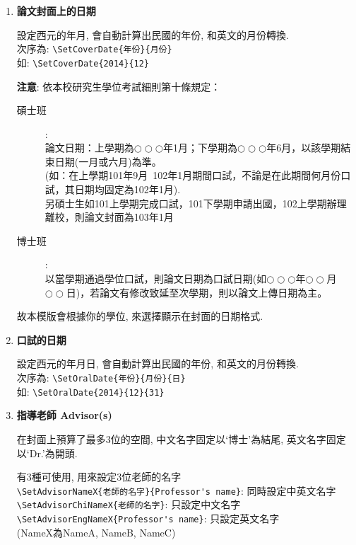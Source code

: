 \begin{enumerate}
  \item
  {
    \textbf{論文封面上的日期}

    設定西元的年月, 會自動計算出民國的年份, 和英文的月份轉換.\\
    次序為: \verb|\SetCoverDate{年份}{月份}|\\
    如: \verb|\SetCoverDate{2014}{12}|

    \textbf{注意}: 依本校研究生學位考試細則第十條規定：
      \begin{description}
        \item[碩士班]: \hfill\\
          論文日期：上學期為$\bigcirc\bigcirc\bigcirc$年1月；下學期為$\bigcirc\bigcirc\bigcirc$年6月，以該學期結束日期(一月或六月)為準。\\
          (如：在上學期101年9月~102年1月期間口試，不論是在此期間何月份口試，其日期均固定為102年1月).\\
          另碩士生如101上學期完成口試，101下學期申請出國，102上學期辦理離校，則論文封面為103年1月

        \item[博士班]: \hfill\\
        以當學期通過學位口試，則論文日期為口試日期(如$\bigcirc\bigcirc\bigcirc$年$\bigcirc\bigcirc$月$\bigcirc\bigcirc$日)，若論文有修改致延至次學期，則以論文上傳日期為主。
      \end{description}
    故本模版會根據你的學位, 來選擇顯示在封面的日期格式.
  } %

  \item
  {
    \textbf{口試的日期}

    設定西元的年月日, 會自動計算出民國的年份, 和英文的月份轉換.\\
    次序為: \verb|\SetOralDate{年份}{月份}{日}|\\
    如: \verb|\SetOralDate{2014}{12}{31}|
  } %

  \item
  {
    \textbf{指導老師 Advisor(s)}

    在封面上預算了最多3位的空間, 中文名字固定以`博士'為結尾, 英文名字固定以`Dr.'為開頭.

    有3種可使用, 用來設定3位老師的名字\\
    \verb|\SetAdvisorNameX{老師的名字}{Professor's name}|: 同時設定中英文名字\\
    \verb|\SetAdvisorChiNameX{老師的名字}|: 只設定中文名字\\
    \verb|\SetAdvisorEngNameX{Professor's name}|: 只設定英文名字\\
    (NameX為NameA, NameB, NameC)

}
\end{enumerate}
